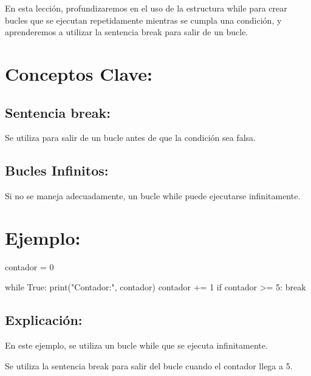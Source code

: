 \documentclass[
  a4paper,
  DIV=11,
  numbers=noendperiod,
  onepage,
  openany]{scrreprt}
\newenvironment{Shaded}{\begin{snugshade}}{\end{snugshade}}
\newcommand{\BuiltInTok}[1]{\textcolor[rgb]{0.00,0.23,0.31}{#1}}
\newcommand{\ControlFlowTok}[1]{\textcolor[rgb]{0.00,0.23,0.31}{#1}}
\newcommand{\DecValTok}[1]{\textcolor[rgb]{0.68,0.00,0.00}{#1}}
\newcommand{\NormalTok}[1]{\textcolor[rgb]{0.00,0.23,0.31}{#1}}
\newcommand{\OperatorTok}[1]{\textcolor[rgb]{0.37,0.37,0.37}{#1}}
\newcommand{\StringTok}[1]{\textcolor[rgb]{0.13,0.47,0.30}{#1}}
\newcommand{\VariableTok}[1]{\textcolor[rgb]{0.07,0.07,0.07}{#1}}
\begin{document}
En esta lección, profundizaremos en el uso de la estructura while para
crear bucles que se ejecutan repetidamente mientras se cumpla una
condición, y aprenderemos a utilizar la sentencia break para salir de un
bucle.

\section{Conceptos Clave:}\label{conceptos-clave-17}

\subsection{Sentencia break:}\label{sentencia-break}

Se utiliza para salir de un bucle antes de que la condición sea falsa.

\subsection{Bucles Infinitos:}\label{bucles-infinitos}

Si no se maneja adecuadamente, un bucle while puede ejecutarse
infinitamente.

\section{Ejemplo:}\label{ejemplo-12}

\begin{Shaded}
\begin{Highlighting}[]
\NormalTok{contador }\OperatorTok{=} \DecValTok{0}

\ControlFlowTok{while} \VariableTok{True}\NormalTok{:}
    \BuiltInTok{print}\NormalTok{(}\StringTok{"Contador:"}\NormalTok{, contador)}
\NormalTok{    contador }\OperatorTok{+=} \DecValTok{1}
    \ControlFlowTok{if}\NormalTok{ contador }\OperatorTok{\textgreater{}=} \DecValTok{5}\NormalTok{:}
        \ControlFlowTok{break}
\end{Highlighting}
\end{Shaded}

\subsection{Explicación:}\label{explicaciuxf3n-26}

En este ejemplo, se utiliza un bucle while que se ejecuta infinitamente.

Se utiliza la sentencia break para salir del bucle cuando el contador
llega a 5.
\end{document}
